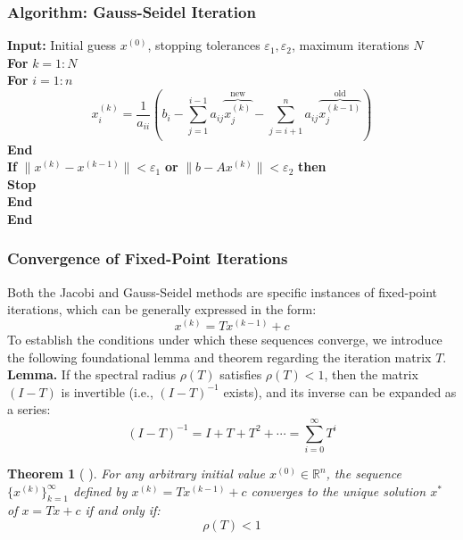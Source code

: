 \documentclass[12pt, a4paper]{article}
\theoremstyle{break}
\newtheorem{theorem}{Theorem}[section]
\begin{document}
\subsubsection*{Algorithm: Gauss-Seidel Iteration}
\textbf{Input:} Initial guess $x^{(0)}$, stopping tolerances $\varepsilon_1, \varepsilon_2$, maximum iterations $N$ \\
\textbf{For} $k = 1 : N$ \\
\hspace*{1em} \textbf{For} $i = 1 : n$
\begin{equation*}
    x_i^{(k)} = \frac{1}{a_{ii}} \left( b_i - \sum_{j=1}^{i-1} a_{ij} \overbrace{x_j^{(k)}}^{\text{new}} - \sum_{j=i+1}^{n} a_{ij} \overbrace{x_j^{(k-1)}}^{\text{old}} \right)
\end{equation*}
\hspace*{1em} \textbf{End} \\
\hspace*{1em} \textbf{If} $\|x^{(k)} - x^{(k-1)}\| < \varepsilon_1$ \textbf{or} $\|b - Ax^{(k)}\| < \varepsilon_2$ \textbf{then} \\
\hspace*{2em} \textbf{Stop} \\
\hspace*{1em} \textbf{End} \\
\textbf{End}

\subsubsection*{Convergence of Fixed-Point Iterations}
Both the Jacobi and Gauss-Seidel methods are specific instances of fixed-point iterations, which can be generally expressed in the form:
\begin{equation*}
    x^{(k)} = Tx^{(k-1)} + c
\end{equation*}
To establish the conditions under which these sequences converge, we introduce the following foundational lemma and theorem regarding the iteration matrix $T$.
\vspace{0.5cm}
\noindent \textbf{Lemma.} If the spectral radius $\rho(T)$ satisfies $\rho(T) < 1$, then the matrix $(I - T)$ is invertible (i.e., $(I - T)^{-1}$ exists), and its inverse can be expanded as a series:
\begin{equation*}
    (I - T)^{-1} = I + T + T^2 + \cdots = \sum_{i=0}^{\infty} T^i
\end{equation*}

\begin{theorem}[ ]
For any arbitrary initial value $x^{(0)} \in \mathbb{R}^n$, the sequence $\{x^{(k)}\}_{k=1}^{\infty}$ defined by $x^{(k)} = Tx^{(k-1)} + c$ converges to the unique solution $x^*$ of $x = Tx + c$ if and only if:
\begin{equation*}
    \rho(T) < 1
\end{equation*}
\end{theorem}
\end{document}

